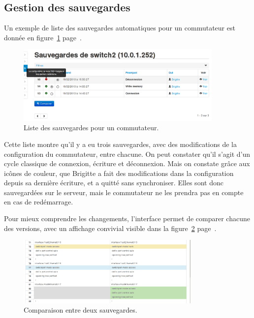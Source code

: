 \subsection{Gestion des sauvegardes}

Un exemple de liste des sauvegardes automatiques pour un commutateur est donnée en figure~\ref{backups} page~\pageref{backups}.

\begin{figure}[!h]
	\begin{center}
	    \includegraphics[width=0.9\textwidth]{img/backups.png}
	\end{center}
	\caption{Liste des sauvegardes pour un commutateur.}
	\label{backups}
\end{figure}

Cette liste montre qu'il y a eu trois sauvegardes, avec des modifications de la configuration du commutateur, entre chacune. On peut constater qu'il s'agit d'un cycle classique de connexion, écriture et déconnexion. Mais on constate grâce aux icônes de couleur, que Brigitte a fait des modifications dans la configuration depuis sa dernière écriture, et a quitté sans synchroniser. Elles sont donc sauvegardées sur le serveur, mais le commutateur ne les prendra pas en compte en cas de redémarrage.

Pour mieux comprendre les changements, l'interface permet de comparer chacune des versions, avec un affichage convivial visible dans la figure~\ref{backupsdiff} page~\pageref{backupsdiff}.

\begin{figure}[!h]
	\begin{center}
	    \includegraphics[width=0.8\textwidth]{img/backupsdiff.png}
	\end{center}
	\caption{Comparaison entre deux sauvegardes.}
	\label{backupsdiff}
\end{figure}

